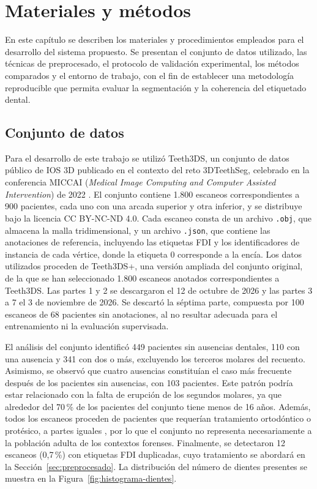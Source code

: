 \chapter{Materiales y métodos}
\label{cap:materiales-metodos}

En este capítulo se describen los materiales y procedimientos empleados para el desarrollo del sistema propuesto. Se presentan el conjunto de datos utilizado, las técnicas de preprocesado, el protocolo de validación experimental, los métodos comparados y el entorno de trabajo, con el fin de establecer una metodología reproducible que permita evaluar la segmentación y la coherencia del etiquetado dental.

\section{Conjunto de datos}
\label{sec:datos}

Para el desarrollo de este trabajo se utilizó Teeth3DS, un conjunto de datos público de IOS 3D publicado en el contexto del reto 3DTeethSeg, celebrado en la conferencia MICCAI (\textit{Medical Image Computing and Computer Assisted Intervention}) de 2022 \cite{ben-hamadouTeeth3DSExtendedBenchmark2026}. El conjunto contiene 1.800 escaneos correspondientes a 900 pacientes, cada uno con una arcada superior y otra inferior, y se distribuye bajo la licencia CC BY-NC-ND 4.0. Cada escaneo consta de un archivo \texttt{.obj}, que almacena la malla tridimensional, y un archivo \texttt{.json}, que contiene las anotaciones de referencia, incluyendo las etiquetas FDI y los identificadores de instancia de cada vértice, donde la etiqueta 0 corresponde a la encía. Los datos utilizados proceden de Teeth3DS+, una versión ampliada del conjunto original, de la que se han seleccionado 1.800 escaneos anotados correspondientes a Teeth3DS. Las partes 1 y 2 se descargaron el 12 de octubre de 2026 y las partes 3 a 7 el 3 de noviembre de 2026. Se descartó la séptima parte, compuesta por 100 escaneos de 68 pacientes sin anotaciones, al no resultar adecuada para el entrenamiento ni la evaluación supervisada. 

El análisis del conjunto identificó 449 pacientes sin ausencias dentales, 110 con una ausencia y 341 con dos o más, excluyendo los terceros molares del recuento. Asimismo, se observó que cuatro ausencias constituían el caso más frecuente después de los pacientes sin ausencias, con 103 pacientes. Este patrón podría estar relacionado con la falta de erupción de los segundos molares, ya que alrededor del 70\,\% de los pacientes del conjunto tiene menos de 16 años. Además, todos los escaneos proceden de pacientes que requerían tratamiento ortodóntico o protésico, a partes iguales \cite{ben-hamadou3DTeethSeg223DTeeth2023}, por lo que el conjunto no representa necesariamente a la población adulta de los contextos forenses. Finalmente, se detectaron 12 escaneos (0{,}7\,\%) con etiquetas FDI duplicadas, cuyo tratamiento se abordará en la Sección~\ref{sec:preprocesado}. La distribución del número de dientes presentes se muestra en la Figura~\ref{fig:histograma-dientes}.

